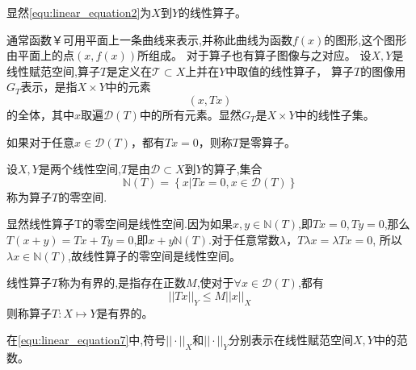 \documentclass{suesreport}
\begin{document}
    显然\cref{equ:linear_equation2}为$X$到$Y$的线性算子。

    \begin{definition}[算子图像]
        通常函数￥可用平面上一条曲线来表示,并称此曲线为函数$f(x)$的图形,这个图形由平面上的点$(x,f(x))$所组成。
        对于算子也有算子图像与之对应。
        设$X,Y$是线性赋范空间,算子$T$是定义在$\mathcal{T}\subset{X}$上并在$Y$中取值的线性算子，
        算子$T$的图像用$G_T$表示，是指$X\times{Y}$中的元素
        \begin{equation}
            \left(x,Tx\right)
        \end{equation}
        的全体，其中$x$取遍$\mathcal{D}(T)$中的所有元素。显然$G_{T}$是$X\times{Y}$中的线性子集。
    \end{definition}
    
    \begin{definition}[零算子]
        如果对于任意$x\in\mathcal{D}(T)$，都有$Tx=0$，则称$T$是零算子。
    \end{definition}

    \begin{definition}[零空间]
        设$X,Y$是两个线性空间,$T$是由$\mathcal{D}\subset{X}$到$Y$的算子,集合
        \begin{equation}
            \mathbb{N}(T)=\left\{x\left|Tx=0,x\in\mathcal{D}(T)\right.\right\}
        \end{equation}
        称为算子$T$的零空间.
    \end{definition}
    显然线性算子T的零空间是线性空间.因为如果$x,y\in\mathbb{N}(T)$,即$Tx=0,Ty=0$,那么$T(x+y)=Tx+Ty=0$,即$x+y\mathbb{N}(T)$.对于任意常数$\lambda$，$T\lambda{x}=\lambda{Tx}=0$,
    所以$\lambda{x}\in\mathbb{N}(T)$,故线性算子的零空间是线性空间。

    \begin{definition}
        线性算子$T$称为有界的,是指存在正数$M$,使对于$\forall{x}\in\mathcal{D}(T)$,都有
        \begin{equation}
            ||Tx||_{Y}\leq{M}||x||_{X}\label{equ:linear_equation7}
        \end{equation}
        则称算子$T:X\mapsto{Y}$是有界的。
    \end{definition}

    在\cref{equ:linear_equation7}中,符号$||\cdot||_{X}$和$||\cdot||_{Y}$分别表示在线性赋范空间$X,Y$中的范数。
\end{document}
